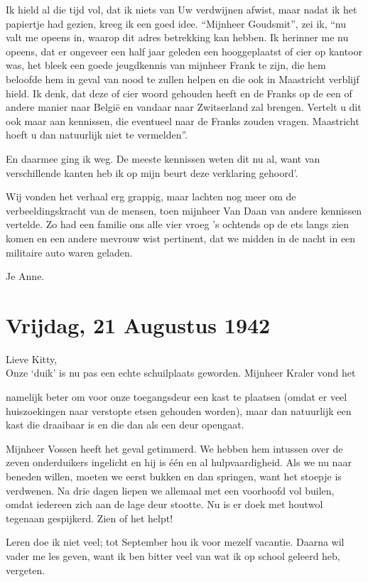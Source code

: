 \documentclass{book}
\begin{document}
Ik hield al die tijd vol, dat ik niets van Uw verdwijnen afwist, maar
nadat ik het papiertje had gezien, kreeg ik een goed idee. ``Mijnheer
Goudsmit'', zei ik, ``nu valt me opeens in, waarop dit adres betrekking
kan hebben. Ik herinner me nu opeens, dat er ongeveer een half jaar
geleden een hooggeplaatst of cier op kantoor was, het bleek een goede
jeugdkennis van mijnheer Frank te zijn, die hem beloofde hem in geval
van nood te zullen helpen en die ook in Maastricht verblijf hield. Ik
denk, dat deze of cier woord gehouden heeft en de Franks op de een of
andere manier naar België en vandaar naar Zwitserland zal brengen.
Vertelt u dit ook maar aan kennissen, die eventueel naar de Franks
zouden vragen. Maastricht hoeft u dan natuurlijk niet te vermelden''.

En daarmee ging ik weg. De meeste kennissen weten dit nu al, want van
verschillende kanten heb ik op mijn beurt deze verklaring gehoord'.

Wij vonden het verhaal erg grappig, maar lachten nog meer om de
verbeeldingskracht van de mensen, toen mijnheer Van Daan van andere
kennissen vertelde. Zo had een familie ons alle vier vroeg 's ochtends
op de ets langs zien komen en een andere mevrouw wist pertinent, dat we
midden in de nacht in een militaire auto waren geladen.

Je Anne.

\chapter{Vrijdag, 21 Augustus 1942}

Lieve Kitty,\\Onze `duik' is nu pas een echte schuilplaats geworden.
Mijnheer Kraler vond het

namelijk beter om voor onze toegangsdeur een kast te plaatsen (omdat er
veel huiszoekingen naar verstopte etsen gehouden worden), maar dan
natuurlijk een kast die draaibaar is en die dan als een deur opengaat.

Mijnheer Vossen heeft het geval getimmerd. We hebben hem intussen over
de zeven onderduikers ingelicht en hij is één en al hulpvaardigheid. Als
we nu naar beneden willen, moeten we eerst bukken en dan springen, want
het stoepje is verdwenen. Na drie dagen liepen we allemaal met een
voorhoofd vol builen, omdat iedereen zich aan de lage deur stootte. Nu
is er doek met houtwol tegenaan gespijkerd. Zien of het helpt!

Leren doe ik niet veel; tot September hou ik voor mezelf vacantie.
Daarna wil vader me les geven, want ik ben bitter veel van wat ik op
school geleerd heb, vergeten.
\end{document}
